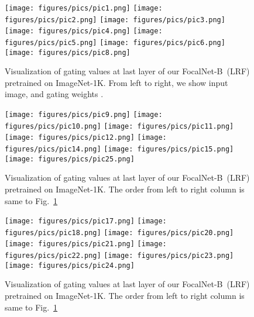 \documentclass{article}
\begin{document}
\begin{figure}[t]
    \centering
    \texttt{[image: figures/pics/pic1.png]}
    \texttt{[image: figures/pics/pic2.png]}
    \texttt{[image: figures/pics/pic3.png]}
    \texttt{[image: figures/pics/pic4.png]}
    \texttt{[image: figures/pics/pic5.png]}
    \texttt{[image: figures/pics/pic6.png]}
\texttt{[image: figures/pics/pic8.png]}
    \caption{Visualization of gating values  at last layer of our FocalNet-B~(LRF) pretrained on ImageNet-1K. From left to right, we show input image, and gating weights .}
    \label{fig:gating_vis1}
\end{figure}

\begin{figure}[t]
    \centering
    \texttt{[image: figures/pics/pic9.png]}
    \texttt{[image: figures/pics/pic10.png]}
    \texttt{[image: figures/pics/pic11.png]}
    \texttt{[image: figures/pics/pic12.png]}
\texttt{[image: figures/pics/pic14.png]}
    \texttt{[image: figures/pics/pic15.png]}
    \texttt{[image: figures/pics/pic25.png]}
    \caption{Visualization of gating values  at last layer of our FocalNet-B~(LRF) pretrained on ImageNet-1K. The order from left to right column is same to Fig.~\ref{fig:gating_vis1}}
    \label{fig:gating_vis2}
\end{figure}

\begin{figure}[t]
    \centering
    \texttt{[image: figures/pics/pic17.png]}
    \texttt{[image: figures/pics/pic18.png]}
\texttt{[image: figures/pics/pic20.png]}
    \texttt{[image: figures/pics/pic21.png]}
    \texttt{[image: figures/pics/pic22.png]}
    \texttt{[image: figures/pics/pic23.png]}
    \texttt{[image: figures/pics/pic24.png]}
    \caption{Visualization of gating values  at last layer of our FocalNet-B~(LRF) pretrained on ImageNet-1K. The order from left to right column is same to Fig.~\ref{fig:gating_vis1}}
    \label{fig:gating_vis3}
\end{figure}
\end{document}
